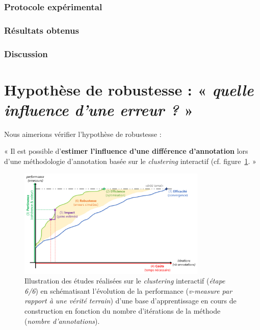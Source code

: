 			\subsubsection{Protocole expérimental}

			\subsubsection{Résultats obtenus}

			\subsubsection{Discussion}
	

    \section{Hypothèse de robustesse : « \textit{quelle influence d'une erreur ?} »}
	\label{section:4.6-HYPOTHESE-ROBUSTESSE}
	
		Nous aimerions vérifier l'hypothèse de robustesse :

		\begin{tcolorbox}[
			title=\textbf{Hypothèse de robustesse},
			colback=gray!20,
			colframe=gray!50!black!75,
			width=\linewidth
		]
			« Il est possible d'\textbf{estimer l'influence d'une différence d'annotation} lors d'une méthodologie d'annotation basée sur le \textit{clustering} interactif (cf. figure~\ref{figure:HYPOTHESE-ROBUSTESSE}. »
			
			
			\begin{figure}[H]
				\centering
				\includegraphics[width=0.8\textwidth]{figures/hypotheses-06-robustesse}
				\caption{Illustration des études réalisées sur le \textit{clustering} interactif (\textit{étape 6/6}) en schématisant l'évolution de la performance (\textit{v-measure par rapport à une vérité terrain}) d'une base d'apprentissage en cours de construction en fonction du nombre d'itérations de la méthode (\textit{nombre d'annotations}).}
				\label{figure:HYPOTHESE-ROBUSTESSE}
			\end{figure}

		\end{tcolorbox}
		
